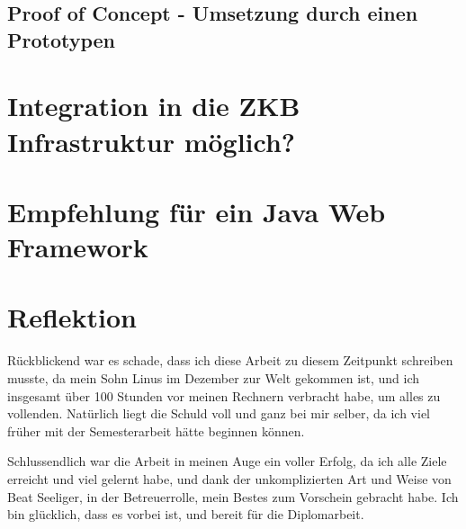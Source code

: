 \documentclass[abstracton, listof=totocnumbered,
bibliography=totocnumbered]{scrreprt}
\begin{document}
  \section{Proof of Concept - Umsetzung durch einen Prototypen}
  
  \chapter{Integration in die ZKB Infrastruktur möglich?}
  
  \chapter{Empfehlung für ein Java Web Framework}
  
  \chapter{Reflektion}
  
  Rückblickend war es schade, dass ich diese Arbeit zu diesem Zeitpunkt
  schreiben musste, da mein Sohn Linus im Dezember zur Welt gekommen ist, und
  ich insgesamt über 100 Stunden vor meinen Rechnern verbracht habe, um alles
  zu vollenden. Natürlich liegt die Schuld voll und ganz bei mir selber, da ich
  viel früher mit der Semesterarbeit hätte beginnen können.
  
  Schlussendlich war die Arbeit in meinen Auge ein voller Erfolg, da ich alle
  Ziele erreicht und viel gelernt habe, und dank der unkomplizierten Art und Weise von
  Beat Seeliger, in der Betreuerrolle, mein Bestes zum Vorschein gebracht habe.
  Ich bin glücklich, dass es vorbei ist, und bereit für die Diplomarbeit.
  
  
  \appendix
  
%  
  
  
\end{document}
